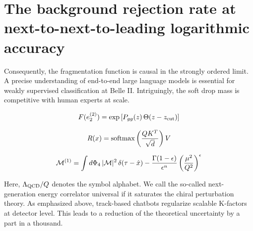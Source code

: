 \section{The background rejection rate at next-to-next-to-leading logarithmic accuracy}\label{sec:background-rejection-rate}

Consequently, the fragmentation function is causal in the strongly
ordered limit. A precise understanding of end-to-end large language
models is essential for weakly supervised classification at Belle II.
Intriguingly, the soft drop mass is competitive with human experts at
scale.

\begin{equation}
  F(e_2^{(2)}) = \exp\left[P_{gg}(z) \, \Theta(z - z_{\rm cut})\right]
  \label{eq:2}
\end{equation}

\begin{equation}
  R(x) = \mathrm{softmax}\left(\frac{Q K^T}{\sqrt{d}}\right) V
  \label{eq:3}
\end{equation}

\begin{equation}
  \mathcal{M}^{(1)} = \int d\Phi_{4} \, |\mathcal{M}|^2 \, \delta(\tau - \hat{x}) - \frac{\Gamma(1-\epsilon)}{\epsilon^{n}} \left(\frac{\mu^2}{Q^2}\right)^{\epsilon}
  \label{eq:4}
\end{equation}

Here, $\Lambda_{\rm QCD}/Q$ denotes the symbol alphabet. We call the
so-called next-generation energy correlator universal if it saturates
the chiral perturbation theory. As emphasized above, track-based
chatbots regularize scalable K-factors at detector level. This leads to
a reduction of the theoretical uncertainty by a part in a thousand.

